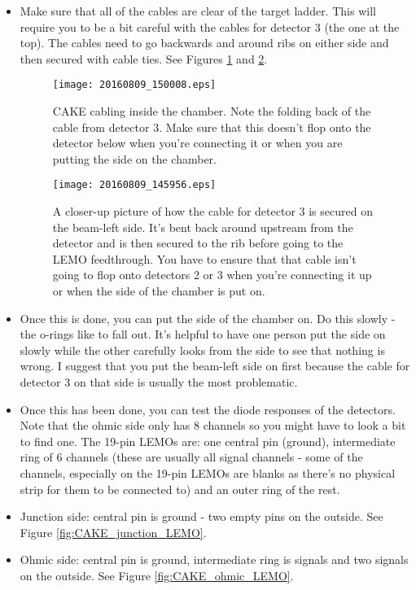\documentclass[11pt]{report}
\begin{document}
\begin{itemize}
\item Make sure that all of the cables are clear of the target ladder. This will require you to be a bit careful with the cables for detector 3 (the one at the top). The cables need to go backwards and around ribs on either side and then secured with cable ties. See Figures \ref{fig:CAKE_cables_in_chamber} and \ref{fig:CAKE_detector3_cable}.

\begin{figure}
 \texttt{[image: 20160809\_150008.eps]}
 \caption{CAKE cabling inside the chamber. Note the folding back of the cable from detector 3. Make sure that this doesn't flop onto the detector below when you're connecting it or when you are putting the side on the chamber.}
 \label{fig:CAKE_cables_in_chamber}
\end{figure}

\begin{figure}
 \texttt{[image: 20160809\_145956.eps]}
 \caption{A closer-up picture of how the cable for detector 3 is secured on the beam-left side. It's bent back around upstream from the detector and is then secured to the rib before going to the LEMO feedthrough. You have to ensure that that cable isn't going to flop onto detectors 2 or 3 when you're connecting it up or when the side of the chamber is put on.}
 \label{fig:CAKE_detector3_cable}
\end{figure}


\item Once this is done, you can put the side of the chamber on. Do this slowly - the o-rings like to fall out. It’s helpful to have one person put the side on slowly while the other carefully looks from the side to see that nothing is wrong. I suggest that you put the beam-left side on first because the cable for detector 3 on that side is usually the most problematic.

\item Once this has been done, you can test the diode responses of the detectors. Note that the ohmic side only has 8 channels so you might have to look a bit to find one. The 19-pin LEMOs are: one central pin (ground), intermediate ring of 6 channels (these are usually all signal channels - some of the channels, especially on the 19-pin LEMOs are blanks as there's no physical strip for them to be connected to) and an outer ring of the rest.

\item Junction side: central pin is ground - two empty pins on the outside. See Figure \ref{fig:CAKE_junction_LEMO}.
\item Ohmic side: central pin is ground, intermediate ring is signals and two signals on the outside. See Figure \ref{fig:CAKE_ohmic_LEMO}.


\end{itemize}
\end{document}
